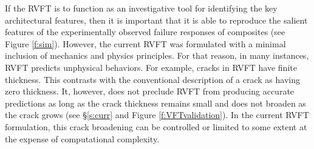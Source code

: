 \documentclass[10pt,letterpaper]{article}
\newcommand{\tableHeaderStyle}{
      \rowfont{\leavevmode\color{white}\bfseries}
      \rowcolor{tableHeader}
  }
\begin{document}


    If the RVFT is to function as an investigative tool for identifying the key architectural features, then it is important that it is able to reproduce the salient features of the experimentally observed failure responses of composites (see Figure \ref{f:sim}). However, the current RVFT was formulated with a minimal inclusion of mechanics and physics principles. For that reason, in many instances, RVFT predicts unphysical behaviors. For example, cracks in RVFT have finite thickness.  This contrasts with the conventional description of a crack as having zero thickness. It, however, does not preclude RVFT from  producing accurate predictions as long as the crack thickness remains small and does not broaden as the crack grows (see \S \ref{s:curr} and Figure \ref{f:VFTvalidation}). In the current RVFT formulation, this crack broadening can be controlled or limited to some extent at the expense of computational complexity.
\end{document}
